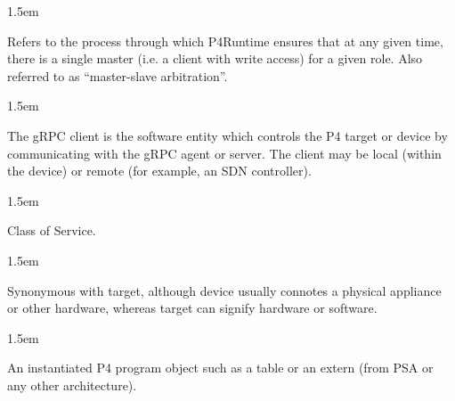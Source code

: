 \documentclass[11pt]{article}
\begin{document}
{%
\begin{mddefinitions}%


\begin{mdbmarginx}{}{}{}{1.5em}%
\begin{mddefdata}%
Refers to the process through which P4Runtime ensures that at any given
time, there is a single master (i.e. a client with write access) for a given
role. Also referred to as \textquotedblleft{}master-slave arbitration\textquotedblright{}.
\end{mddefdata}%
\end{mdbmarginx}%


\begin{mdbmarginx}{}{}{}{1.5em}%
\begin{mddefdata}%
The gRPC client is the software entity which controls the P4 target or
device by communicating with the gRPC agent or server. The client may be
local (within the device) or remote (for example, an SDN controller).
\end{mddefdata}%
\end{mdbmarginx}%


\begin{mdbmarginx}{}{}{}{1.5em}%
\begin{mddefdata}%
Class of Service.
\end{mddefdata}%
\end{mdbmarginx}%


\begin{mdbmarginx}{}{}{}{1.5em}%
\begin{mddefdata}%
Synonymous with target, although device usually connotes a physical
appliance or other hardware, whereas target can signify hardware or
software.
\end{mddefdata}%
\end{mdbmarginx}%


\begin{mdbmarginx}{}{}{}{1.5em}%
\begin{mddefdata}%
An instantiated P4 program object such as a table or an extern (from PSA or
any other architecture).
\end{mddefdata}%
\end{mdbmarginx}%


\end{mddefinitions}}
\end{document}
